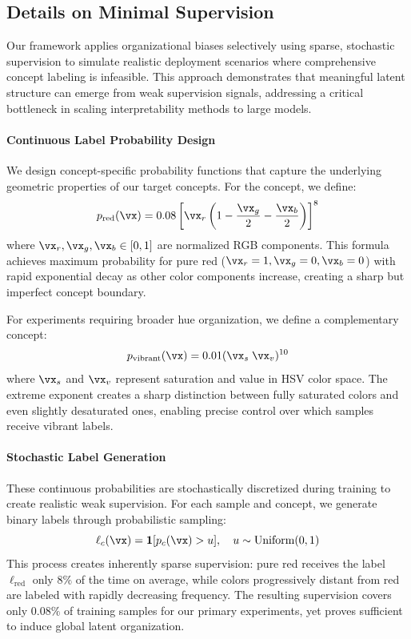 \subsection{Details on Minimal Supervision}
\label{sec:minimal_supervision}

Our framework applies organizational biases selectively using sparse, stochastic supervision to simulate realistic deployment scenarios where comprehensive concept labeling is infeasible. This approach demonstrates that meaningful latent structure can emerge from weak supervision signals, addressing a critical bottleneck in scaling interpretability methods to large models.

\paragraph{Continuous Label Probability Design}
We design concept-specific probability functions that capture the underlying geometric properties of our target concepts. For the  concept, we define:
\begin{equation}
    p_{\text{red}}(\vx) = 0.08 \left[\vx_r \left(1 - \frac{\vx_g}{2} - \frac{\vx_b}{2}\right)\right]^{8}
\end{equation}
where $\vx_r, \vx_g, \vx_b \in [0,1]$ are normalized RGB components. This formula achieves maximum probability for pure red ($\vx_r=1, \vx_g=0, \vx_b=0$) with rapid exponential decay as other color components increase, creating a sharp but imperfect concept boundary.

For experiments requiring broader hue organization, we define a complementary  concept:
\begin{equation}
    p_{\text{vibrant}}(\vx) = 0.01 (\vx_s \; \vx_v)^{10}
\end{equation}
where $\vx_s$ and $\vx_v$ represent saturation and value in HSV color space. The extreme exponent creates a sharp distinction between fully saturated colors and even slightly desaturated ones, enabling precise control over which samples receive vibrant labels.

\paragraph{Stochastic Label Generation}
These continuous probabilities are stochastically discretized during training to create realistic weak supervision. For each sample and concept, we generate binary labels through probabilistic sampling:
\begin{equation}
    \ell_c(\vx) = \mathbf{1}[p_c(\vx) > u], \quad u \sim \text{Uniform}(0,1)
\end{equation}
This process creates inherently sparse supervision: pure red receives the  label $\ell_{\text{red}}$ only $8\%$ of the time on average, while colors progressively distant from red are labeled with rapidly decreasing frequency. The resulting supervision covers only $0.08\%$ of training samples for our primary experiments, yet proves sufficient to induce global latent organization.

